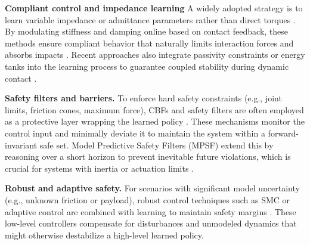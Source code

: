 \documentclass[Afour,sageh,times]{template/sagej}
\begin{document}
\textbf{Compliant control and impedance learning}
A widely adopted strategy is to learn variable impedance or admittance parameters rather than direct torques \cite{23, 25, 28, 317}. 
By modulating stiffness and damping online based on contact feedback, these methods ensure compliant behavior that naturally limits interaction forces and absorbs impacts \cite{1, 40, 74}.
Recent approaches also integrate passivity constraints or energy tanks into the learning process to guarantee coupled stability during dynamic contact \cite{zhang2025passivity, 35}.

\textbf{Safety filters and barriers.}
To enforce hard safety constraints (e.g., joint limits, friction cones, maximum force), CBFs and safety filters are often employed as a protective layer wrapping the learned policy \cite{29, 152, 235}.
These mechanisms monitor the control input and minimally deviate it to maintain the system within a forward-invariant safe set.
Model Predictive Safety Filters (MPSF) extend this by reasoning over a short horizon to prevent inevitable future violations, which is crucial for systems with inertia or actuation limits \cite{21, 212}.

\textbf{Robust and adaptive safety.}
For scenarios with significant model uncertainty (e.g., unknown friction or payload), robust control techniques such as SMC or adaptive control are combined with learning to maintain safety margins \cite{5, 60, 94}.
These low-level controllers compensate for disturbances and unmodeled dynamics that might otherwise destabilize a high-level learned policy.

\end{document}

